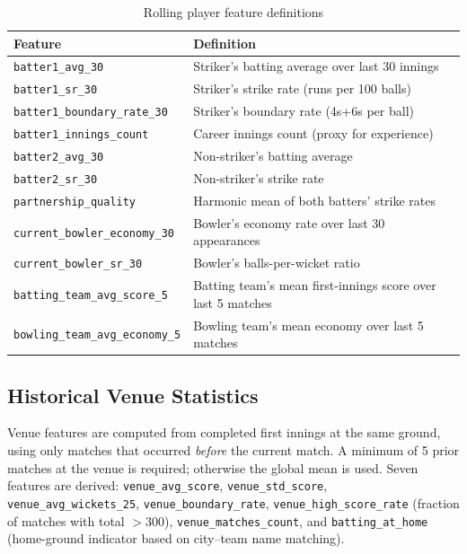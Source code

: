 \documentclass[12pt,a4paper,oneside]{report}
\begin{document}
\begin{table}[htbp]
\centering
\caption{Rolling player feature definitions}
\label{tab:player_feats}
\small
\begin{tabular}{lp{9cm}}
\toprule
\textbf{Feature} & \textbf{Definition} \\
\midrule
\texttt{batter1\_avg\_30}          & Striker's batting average over last 30 innings \\
\texttt{batter1\_sr\_30}           & Striker's strike rate (runs per 100 balls) \\
\texttt{batter1\_boundary\_rate\_30} & Striker's boundary rate (4s+6s per ball) \\
\texttt{batter1\_innings\_count}   & Career innings count (proxy for experience) \\
\texttt{batter2\_avg\_30}          & Non-striker's batting average \\
\texttt{batter2\_sr\_30}           & Non-striker's strike rate \\
\texttt{partnership\_quality}      & Harmonic mean of both batters' strike rates \\
\texttt{current\_bowler\_economy\_30} & Bowler's economy rate over last 30 appearances \\
\texttt{current\_bowler\_sr\_30}   & Bowler's balls-per-wicket ratio \\
\texttt{batting\_team\_avg\_score\_5} & Batting team's mean first-innings score over last 5 matches \\
\texttt{bowling\_team\_avg\_economy\_5} & Bowling team's mean economy over last 5 matches \\
\bottomrule
\end{tabular}
\end{table}

\subsection{Historical Venue Statistics}

Venue features are computed from completed first innings at the same ground, using only matches that occurred \emph{before} the current match.  A minimum of 5 prior matches at the venue is required; otherwise the global mean is used.  Seven features are derived: \texttt{venue\_avg\_score}, \texttt{venue\_std\_score}, \texttt{venue\_avg\_wickets\_25}, \texttt{venue\_boundary\_rate}, \texttt{venue\_high\_score\_rate} (fraction of matches with total $>300$), \texttt{venue\_matches\_count}, and \texttt{batting\_at\_home} (home-ground indicator based on city--team name matching).
\end{document}
